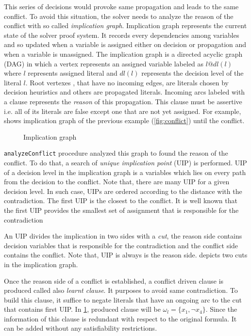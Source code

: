 This series of decisions would provoke same propagation and leads to the same conflict. To avoid this
situation, the solver needs to analyze the reason of the conflict with so called \emph{implication graph}.
Implication graph represents the current state of the solver proof system. It records every dependencies
among variables and so updated when a variable is assigned either on decision or propagation and when a variable
is unassigned. The implication graph is a directed acyclic graph (DAG) in which a vertex represents an assigned variable labeled as $l@dl(l)$ where $l$ represents assigned literal and $dl(l)$ represents the decision level of the literal $l$.
Root vertexes , that have no incoming edges, are literals chosen by decision heuristics and others are 
propagated literals.
Incoming arcs labeled with a clause represents the \emph{reason} of this propagation.
This clause must be assertive i.e. all of its literals are false except one that are not yet assigned.
For example,  shows implication graph of the previous example (\cref{fig:conflict}) until the conflict.

\begin{figure}[H]
	\centering
	
	\caption{Implication graph}
	\label{fig:implication-graph}
\end{figure}


\texttt{analyzeConflict} procedure analyzed this graph to found the reason of the conflict. To do that, a search of
\emph{unique implication point} (UIP) is performed. UIP of a decision level in the implication graph is a variables
which lies on every path from the decision to the conflict. Note that, there are many UIP for a given decision level.
In such case, UIPs are ordered according to the distance with the contradiction. The first UIP is the closest to
the conflict. It is well known that the first UIP provides the smallest set of assignment that is responsible for the
contradiction~\cite{zhang2001efficient}

An UIP divides the implication in two sides with a \emph{cut}, the reason side contains decision variables 
that is responsible for the contradiction and the conflict side contains the conflict. Note that, UIP is always is the 
reason side.  depicts two cuts in the implication graph.

Once the reason side of a conflict is established, a conflict driven clause is produced called also 
\emph{learnt clause}. It purposes to avoid same contradiction. To build this clause, it suffice to negate 
literals that have an ongoing arc to the cut that contains first UIP. In \cref{fig:implication-graph}, produced
clause will be $\omega_l = \{x_1, \neg x_4 \}$. Since the information of this clause is redundant with respect to 
the original formula. It can be added without any satisfiability restrictions. 


